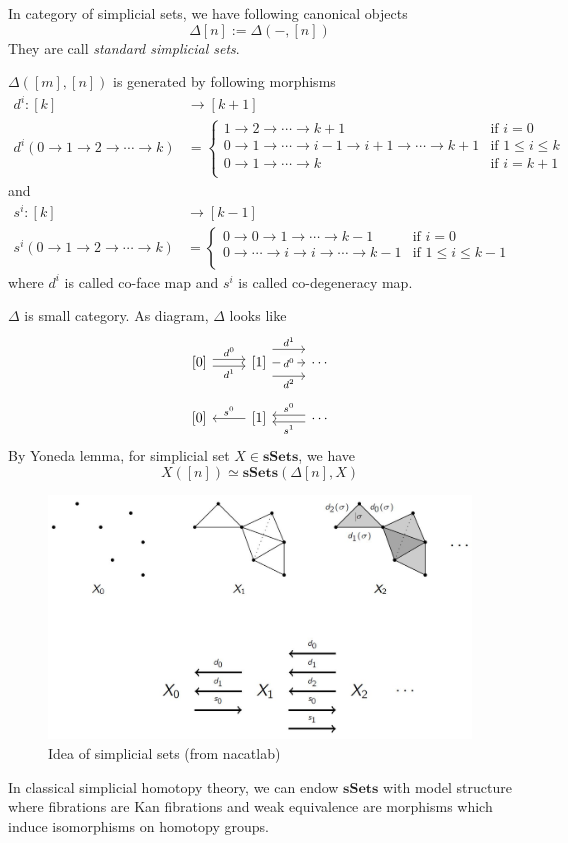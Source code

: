 \documentclass[a4paper,11pt]{article}
\begin{document}
	In category of simplicial sets, we have following canonical objects
	\[
	\Delta[n] := \Delta(-,[n])
	\]
	They are call \emph{standard simplicial sets}.
	\begin{secprop}
		$\Delta([m],[n])$ is generated by following morphisms
		\[
		\begin{aligned}
			d^i \colon [k] &\to [k+1]\\
			d^i(0 \to 1 \to 2 \to \cdots \to k)&=\begin{cases}
			1\to 2 \to \cdots \to k+1& \text{if } i =0\\
			0 \to 1 \to \cdots \to i-1 \to i+1 \to \cdots \to k+1& \text{if } 1\leq i \leq k\\
			0 \to 1 \to \cdots \to k& \text{if } i =k+1\\
			\end{cases}
		\end{aligned} 
		\]
		and
		\[
		\begin{aligned}
		s^i \colon [k] &\to [k-1]\\
		s^i(0 \to 1 \to 2 \to \cdots \to k)&=\begin{cases}
		0\to 0 \to 1 \to \cdots \to k-1& \text{if } i =0\\
		0 \to \cdots \to i \to i  \to \cdots \to k-1& \text{if } 1\leq i \leq k-1\\
		\end{cases}
		\end{aligned} 
		\]
		where $d^i$ is called co-face map and $s^i$ is called co-degeneracy map.
	\end{secprop}
$\Delta$ is small category. As diagram, $\Delta$ looks like
\[
\begin{tikzcd} 
 {[0]} \arrow[r, shift left,"d^0"] \arrow[r, shift right,"d^1"'] & {[1]} \arrow[r,"d^0" description] \arrow[r, shift left=4,"d^1"] \arrow[r, shift right=4,"d^2"'] & \cdots 
\end{tikzcd}
\]
\[
\begin{tikzcd} 
{[0]} \arrow[r,"s^0",leftarrow] & {[1]} \arrow[r,shift left,"s^0",leftarrow] \arrow[r, shift right,"s^1"',leftarrow]  & \cdots 
\end{tikzcd}
\]
By Yoneda lemma, for simplicial set $X \in \mathbf{sSets}$, we have 
\[
X([n])\simeq \mathbf{sSets}(\Delta[n], X)
\]
\begin{figure}[h]
	\caption{Idea of simplicial sets (from nacatlab)}
\centering\includegraphics[scale=0.5]{PIC/SimplicialSetsIdea.jpg}
\end{figure}

In classical simplicial homotopy theory, we can endow $\mathbf{sSets}$ with model structure where fibrations are Kan fibrations and weak equivalence are morphisms which induce isomorphisms on homotopy groups.
\end{document}
